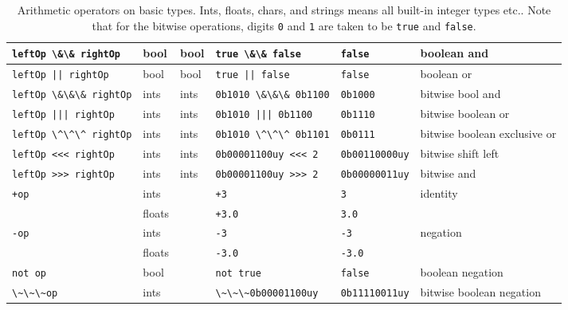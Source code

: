 \begin{table}[ht]
\begin{tabularx}{\linewidth}{|l|l|l|l|l|X|}
    \hline
    \lstinline!leftOp \&\& rightOp!&bool & bool & \lstinline!true \&\& false!&\lstinline!false!&boolean and\\
    \hline
    \lstinline!leftOp || rightOp!&bool & bool & \lstinline!true || false!&\lstinline!false!&boolean or\\
    \hline
    \lstinline!leftOp \&\&\& rightOp!&ints & ints & \lstinline!0b1010 \&\&\& 0b1100!&\lstinline!0b1000!&bitwise bool and\\
    \hline
    \lstinline!leftOp ||| rightOp!&ints & ints & \lstinline!0b1010 ||| 0b1100!&\lstinline!0b1110!&bitwise boolean or\\
    \hline
    \lstinline!leftOp \^\^\^ rightOp!&ints & ints & \lstinline!0b1010 \^\^\^ 0b1101!&\lstinline!0b0111!&bitwise boolean exclusive or\\
    \hline
     \lstinline!leftOp <<< rightOp!&ints & ints & \lstinline!0b00001100uy <<< 2!&\lstinline!0b00110000uy!&bitwise shift left\\
     \hline
     \lstinline!leftOp >>> rightOp!&ints & ints & \lstinline!0b00001100uy >>> 2!&\lstinline!0b00000011uy!&bitwise and\\
     \hline
    \lstinline!+op!&ints&&\lstinline!+3!&\lstinline!3!&identity\\
             &floats&&\lstinline!+3.0!&\lstinline!3.0!&\\
    \hline
    \lstinline!-op!&ints&&\lstinline!-3!&\lstinline!-3!&negation\\
             &floats&&\lstinline!-3.0!&\lstinline!-3.0!&\\
    \hline
    \lstinline!not op!&bool&&\lstinline!not true!&\lstinline!false!&boolean negation\\
    \hline
    \lstinline!\~\~\~op!&ints&&\lstinline!\~\~\~0b00001100uy!&\lstinline!0b11110011uy!&bitwise boolean negation\\
    \hline
  \end{tabularx}
  \caption{Arithmetic operators on basic types. Ints, floats, chars, and strings means all built-in integer types etc.. Note that for the bitwise operations, digits \lstinline{0} and \lstinline{1} are taken to be \lstinline{true} and \lstinline{false}.}
  \label{tab:preNInfixOperators}
\end{table}

